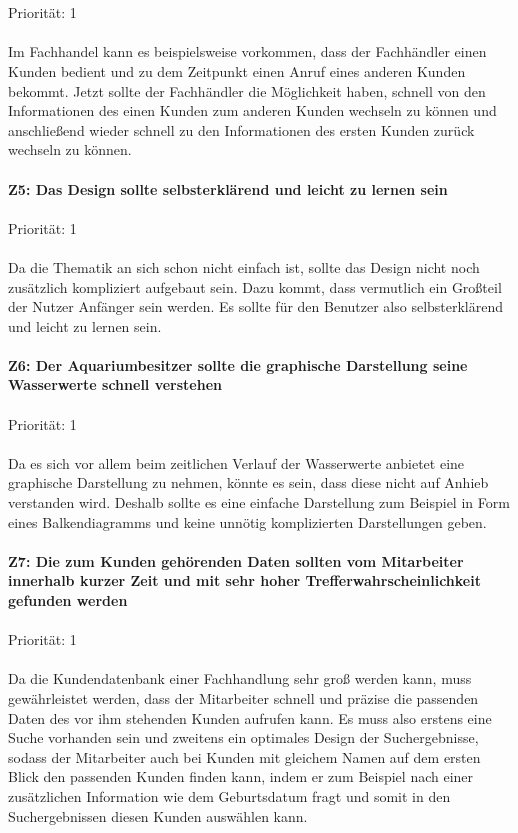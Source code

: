\\ \\
Priorität: 1
\\ \\
Im Fachhandel kann es beispielsweise vorkommen, dass der Fachhändler einen Kunden bedient und zu dem Zeitpunkt einen Anruf eines anderen Kunden bekommt. Jetzt sollte der Fachhändler die Möglichkeit haben, schnell von den Informationen des einen Kunden zum anderen Kunden wechseln zu können und anschließend wieder schnell zu den Informationen des ersten Kunden zurück wechseln zu können.
\\ \\
\textbf{Z5: Das Design sollte selbsterklärend und leicht zu lernen sein}
\\ \\
Priorität: 1
\\ \\
Da die Thematik an sich schon nicht einfach ist, sollte das Design nicht noch zusätzlich kompliziert aufgebaut sein. Dazu kommt, dass vermutlich ein Großteil der Nutzer Anfänger sein werden. Es sollte für den Benutzer also selbsterklärend und leicht zu lernen sein. 
\\ \\
\textbf{Z6: Der Aquariumbesitzer sollte die graphische Darstellung seine Wasserwerte schnell verstehen}
\\ \\
Priorität: 1
\\ \\
Da es sich vor allem beim zeitlichen Verlauf der Wasserwerte anbietet eine graphische Darstellung zu nehmen, könnte es sein, dass diese nicht auf Anhieb verstanden wird. Deshalb sollte es eine einfache Darstellung zum Beispiel in Form eines Balkendiagramms und keine unnötig komplizierten Darstellungen geben.
\\ \\
\textbf{Z7: Die zum Kunden gehörenden Daten sollten vom Mitarbeiter innerhalb kurzer Zeit und mit sehr hoher Trefferwahrscheinlichkeit gefunden werden}
\\ \\
Priorität: 1
\\ \\
Da die Kundendatenbank einer Fachhandlung sehr groß werden kann, muss gewährleistet werden, dass der Mitarbeiter schnell und präzise die passenden Daten des vor ihm stehenden Kunden aufrufen kann. Es muss also erstens eine Suche vorhanden sein und zweitens ein optimales Design der Suchergebnisse, sodass der Mitarbeiter auch bei Kunden mit gleichem Namen auf dem ersten Blick den passenden Kunden finden kann, indem er zum Beispiel nach einer zusätzlichen Information wie dem Geburtsdatum fragt und somit in den Suchergebnissen diesen Kunden auswählen kann.
